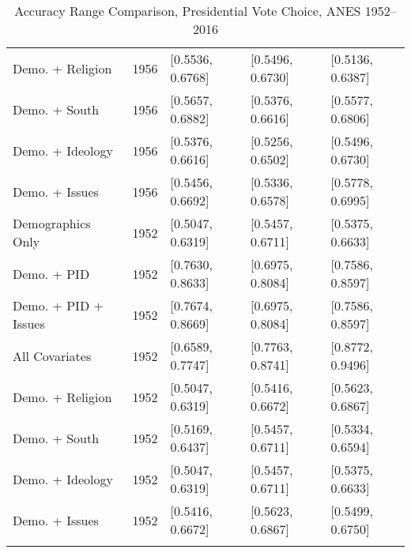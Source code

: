 \begin{longtable}{lrlll}
  Demo. + Religion & 1956 & [0.5536, 0.6768] & [0.5496, 0.6730] & [0.5136, 0.6387] \\ 
  Demo. + South & 1956 & [0.5657, 0.6882] & [0.5376, 0.6616] & [0.5577, 0.6806] \\ 
  Demo. + Ideology & 1956 & [0.5376, 0.6616] & [0.5256, 0.6502] & [0.5496, 0.6730] \\ 
  Demo. + Issues & 1956 & [0.5456, 0.6692] & [0.5336, 0.6578] & [0.5778, 0.6995] \\ 
  Demographics Only & 1952 & [0.5047, 0.6319] & [0.5457, 0.6711] & [0.5375, 0.6633] \\ 
  Demo. + PID & 1952 & [0.7630, 0.8633] & [0.6975, 0.8084] & [0.7586, 0.8597] \\ 
  Demo. + PID + Issues & 1952 & [0.7674, 0.8669] & [0.6975, 0.8084] & [0.7586, 0.8597] \\ 
  All Covariates & 1952 & [0.6589, 0.7747] & [0.7763, 0.8741] & [0.8772, 0.9496] \\ 
  Demo. + Religion & 1952 & [0.5047, 0.6319] & [0.5416, 0.6672] & [0.5623, 0.6867] \\ 
  Demo. + South & 1952 & [0.5169, 0.6437] & [0.5457, 0.6711] & [0.5334, 0.6594] \\ 
  Demo. + Ideology & 1952 & [0.5047, 0.6319] & [0.5457, 0.6711] & [0.5375, 0.6633] \\ 
  Demo. + Issues & 1952 & [0.5416, 0.6672] & [0.5623, 0.6867] & [0.5499, 0.6750] \\ 
   \bottomrule
\caption{Accuracy Range Comparison, Presidential Vote Choice, ANES 1952--2016} 
\label{tab:ANES_prezvote_accuracy}
\end{longtable}
